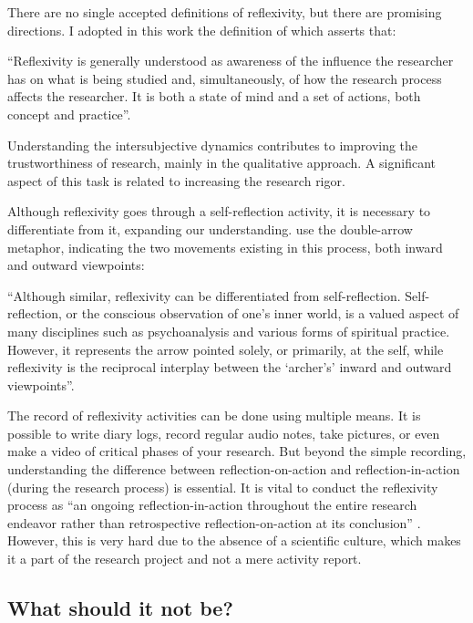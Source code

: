 There are no single accepted definitions of reflexivity, but there are promising directions. I adopted in this work the definition of  which asserts that:
\begin{citacao}
    “Reflexivity is generally understood as awareness of the influence the researcher has on what is being studied and, simultaneously, of how the research process affects the researcher. It is both a state of mind and a set of actions, both concept and practice”.
\end{citacao}
Understanding the intersubjective dynamics contributes to improving the trustworthiness of research, mainly in the qualitative approach. A significant aspect of this task is related to increasing the research rigor.

Although reflexivity goes through a self-reflection activity, it is necessary to differentiate from it, expanding our understanding.   use the double-arrow metaphor, indicating the two movements existing in this process, both inward and outward viewpoints:
\begin{citacao}
    “Although similar, reflexivity can be differentiated from self-reflection. Self-reflection, or the conscious observation of one’s inner world, is a valued aspect of many disciplines such as psychoanalysis and various forms of spiritual practice. However, it represents the arrow pointed solely, or primarily, at the self, while reflexivity is the reciprocal interplay between the ‘archer’s’ inward and outward viewpoints”.
\end{citacao}

The record of reflexivity activities can be done using multiple means. It is possible to write diary logs, record regular audio notes, take pictures, or even make a video of critical phases of your research. But beyond the simple recording, understanding the difference between reflection-on-action and reflection-in-action (during the research process) is essential. It is vital to conduct the reflexivity process as “an ongoing reflection-in-action throughout the entire research endeavor rather than retrospective reflection-on-action at its conclusion” \cite[p.~815]{probst:2014}. However, this is very hard due to the absence of a scientific culture, which makes it a part of the research project and not a mere activity report.

\subsection{What should it not be?}

